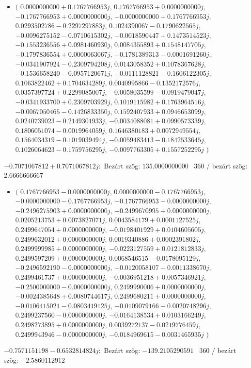 \documentclass[14pt,a4paper]{article}
\begin{document}
\begin{itemize}
\item
$\big($
$0.0000000000+0.1767766953j$, $0.1767766953+0.0000000000j$, $-0.1767766953+0.0000000000j$, $-0.0000000000+0.1767766953j$, $0.0293502786-0.2297297883j$, $0.1024390067-0.1790622565j$, $-0.0096275152-0.0710615302j$, $-0.0018590447+0.1473514523j$, $-0.1553236556+0.0981460930j$, $0.0084355893+0.1548147705j$, $-0.1797836554+0.0000063067j$, $-0.1781389313-0.0001691260j$, $-0.0341907924-0.2309794208j$, $0.0143058352+0.1078367628j$, $-0.1536658240-0.0957120671j$, $-0.0111128821-0.1606122305j$, $0.1063822462+0.1704634289j$, $0.0040995866-0.1352172576j$, $0.0357397724+0.2299085007j$, $-0.0058035599-0.0919479047j$, $-0.0341933700+0.2309703929j$, $0.1019115982+0.1763964516j$, $-0.0067050465-0.1426833350j$, $0.1592407933+0.0946653099j$, $0.0240739023-0.2149301933j$, $-0.0034088081+0.0990573339j$, $0.1806051074-0.0019964059j$, $0.1646380183+0.0072949554j$, $0.1564034319-0.1019039494j$, $-0.0059483413-0.1842533645j$, $0.1026064623-0.1759756295j$, $-0.0097763305+0.1557252295j$
$\big)$
\end{itemize}
$-0.7071067812+0.7071067812j$:\
Bezárt szög: $135.0000000000$ \
360 / bezárt szög: $2.6666666667$\
\begin{itemize}
\item
$\big($
$0.1767766953-0.0000000000j$, $0.0000000000-0.1767766953j$, $-0.0000000000-0.1767766953j$, $-0.1767766953-0.0000000000j$, $-0.2496275903+0.0000000000j$, $-0.2499670995+0.0000000000j$, $0.0205213753+0.0073827071j$, $0.0043584179+0.0001127525j$, $0.2499647054+0.0000000000j$, $-0.0198401929+0.0104605605j$, $0.2499632012+0.0000000000j$, $0.0019340886+0.0002391802j$, $0.2499999985+0.0000000000j$, $-0.0223127559+0.0121812833j$, $0.2499597209+0.0000000000j$, $0.0068546515-0.0178095129j$, $-0.2496592190-0.0000000000j$, $-0.0120058107-0.0011338670j$, $0.2499461737+0.0000000000j$, $-0.0036951218+0.0057346921j$, $-0.2500000000-0.0000000000j$, $0.2499990006+0.0000000000j$, $-0.0024385648+0.0080744617j$, $0.2499680211+0.0000000000j$, $-0.0106415021-0.0803419125j$, $-0.0109079166-0.0020748296j$, $0.2499237560-0.0000000000j$, $-0.0164138534+0.0103166249j$, $0.2498273895+0.0000000000j$, $0.0039272137-0.0219776459j$, $0.2499943946-0.0000000000j$, $-0.0184969615-0.0031465935j$
$\big)$
\end{itemize}
$-0.7571151198-0.6532814824j$:\
Bezárt szög: $-139.2105290591$ \
360 / bezárt szög: $-2.5860112912$\
\end{document}
